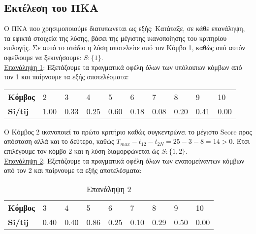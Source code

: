 \documentclass[12pt, a4paper]{article}
\begin{document}
\subsection{Εκτέλεση του ΠΚΑ}

Ο ΠΚΑ που χρησιμοποιούμε διατυπωνεται ως εξής: Κατάταξε, σε κάθε επανάληψη, τα εφικτά στοιχεία της λύσης, βάσει της μέγιστης ικανοποίησης του κριτηρίου επιλογής. Σε αυτό το στάδιο η λύση αποτελείτε από τον Κόμβο 1, καθώς από αυτόν οφείλουμε να ξεκινήσουμε: \( S: \{1\}\). \\

\underline{Επανάληψη 1}:  Εξετάζουμε τα πραγματικά οφέλη όλων των υπόλοιπων κόμβων από τον 1 και παίρνουμε τα εξής αποτελέσματα:

\begin{table}[h]
\centering
\label{my-label}
\begin{tabular}{l|l|l|l|l|l|l|l|l|l|}
\cline{2-10}
\textbf{Κόμβος} & 2    & 3    & 4    & 5    & 6    & 7    & 8    & 9    & 10   \\ \cline{2-10} 
\textbf{Si/tij} & 1.00 & 0.33 & 0.25 & 0.60 & 0.18 & 0.08 & 0.20 & 0.41 & 0.00 \\ \cline{2-10} 
\end{tabular}

\end{table}

Ο Κόμβος 2 ικανοποιεί το πρώτο κριτήριο καθώς συγκεντρώνει το μέγιστο Score προς απόσταση αλλά και το δεύτερο, καθώς  \( T_{max} - t_{12} - t_{2N} = 25 - 3 - 8 = 14 > 0\). Έτσι επιλέγουμε τον κόμβο 2 και η λύση διαμορφώνεται ώς \( S: \{1, 2\}\). \\

\underline{Επανάληψη 2}:  Εξετάζουμε τα πραγματικά οφέλη όλων των εναπομείναντων κόμβων από τον 2  και παίρνουμε τα εξής αποτελέσματα:

\begin{table}[h]
\centering
\begin{tabular}{l|l|l|l|l|l|l|l|l|}
\cline{2-9}
\textbf{Κόμβος} & 3 & 4 & 5 & 6 & 7 & 8 & 9 & 10 \\ \cline{2-9} 
\textbf{Si/tij} & 0.40 & 0.40 & 0.86 & 0.25 & 0.10 & 0.29 & 0.50 & 0.00 \\ \cline{2-9} 
\end{tabular}
\caption{Επανάληψη 2}
\label{my-label}
\end{table}
\end{document}
